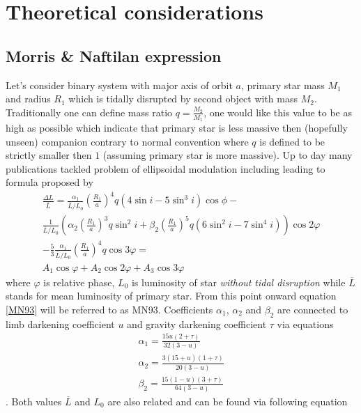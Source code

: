 \documentclass{pracalicmgr}
\begin{document}
\chapter{Theoretical considerations}\label{theo}
\section{Morris \& Naftilan expression}
\hspace{1cm} Let's consider binary system with major axis of orbit $a$, primary star mass $M_1$ and radius $R_1$ which is tidally disrupted by second object with mass $M_2$.
Traditionally one can define mass ratio $q=\frac{M_2}{M_1}$, one would like this value to be as high as possible which indicate that primary star
is less massive then (hopefully unseen) companion contrary to normal convention where $q$ is defined to be strictly smaller then $1$ (assuming primary star is more massive).
Up to day many publications tackled problem of ellipsoidal modulation including \citep{kopal_close_1959} leading to formula proposed by \citep{morris_equations_1993}  
\begin{align}\label{MN93}
    \frac{\Delta{L}}{\overline{L}}=\frac{\alpha_1}{\overline{L}/L_0}\left(\frac{R_1}{a}\right)^4q\left(4\sin{i}-5\sin^3{i}\right)\cos{\phi}- \\
    \frac{1}{\overline{L}/L_0}\left(\alpha_2\left(\frac{R_1}{a}\right)^3q\sin^2{i}+\beta_2
    \left(\frac{R_1}{a}\right)^5q\left(6\sin^2{i}-7\sin^4{i}\right)\right)\cos{2\varphi} \\
    -\frac{5}{3}\frac{\alpha_1}{\overline{L}/L_0}\left(\frac{R_1}{a}\right)^4q\cos{3\varphi}=\\
    A_1\cos{\varphi}+A_2\cos{2\varphi}+A_3\cos{3\varphi}
\end{align}
where $\varphi$ is relative phase, $L_0$ is luminosity of star {\it without tidal disruption} while $\overline{L}$ stands for mean luminosity of primary star. From this point
onward equation \ref{MN93} will be referred to as MN93.
Coefficients $\alpha_1$, $\alpha_2$ and
$\beta_2$ are connected to limb darkening coefficient $u$ and gravity darkening coefficient $\tau$ via equations
\begin{align}
    \alpha_1=\frac{15u(2+\tau)}{32(3-u)}\\
    \alpha_2=\frac{3(15+u)(1+\tau)}{20(3-u)}\\
    \beta_2=\frac{15(1-u)(3+\tau)}{64(3-u)}
\end{align}. 
Both values $\overline{L}$ and $L_0$ are also related and can be found via following equation
\end{document}
